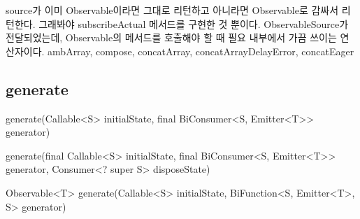 \documentclass{book}
\begin{document}
source가 이미 Observable이라면 그대로 리턴하고 아니라면 Observable로 감싸서 리턴한다.
그래봐야 subscribeActual 메서드를 구현한 것 뿐이다.
ObservableSource가 전달되었는데, Observable의 메서드를 호출해야 할 때 필요
내부에서 가끔 쓰이는 연산자이다.
ambArray, compose, concatArray, concatArrayDelayError, concatEager

\subsection{generate}
generate(Callable<S> initialState, final BiConsumer<S, Emitter<T>> generator)

generate(final Callable<S> initialState,
            final BiConsumer<S, Emitter<T>> generator,
            Consumer<? super S> disposeState)

Observable<T> generate(Callable<S> initialState, BiFunction<S, Emitter<T>, S> generator)
\end{document}
